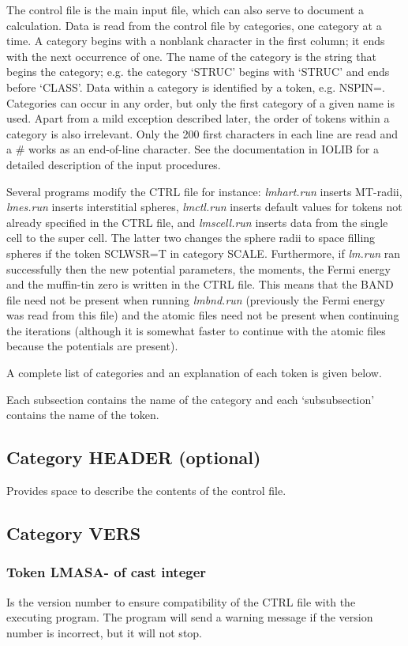 \documentclass[aps,twocolumn,a4]{revtex4}
\begin{document}
The control file is the main input file, which can also serve to
document a calculation.  Data is read from the control file by
categories, one category at a time.  A category begins with a nonblank
character in the first column; it ends with the next occurrence of one.
The name of the category is the string that begins the category; e.g.
the category `STRUC' begins with `STRUC' and ends before `CLASS'.
Data within a category is identified by a token, e.g.  NSPIN=.
Categories can occur in any order, but only the first category of a
given name is used.  Apart from a mild exception described later, the
order of tokens within a category is also irrelevant. Only the 200 first
characters in each line are read and a \# works as an end-of-line
character. See the documentation in IOLIB for a detailed description
of the input procedures.

Several programs modify the CTRL file for instance:
{\em lmhart.run} inserts
MT-radii, {\em lmes.run} inserts interstitial spheres,
{\em lmctl.run} inserts default values for tokens not already
specified in the CTRL file, and {\em lmscell.run} inserts data
from the single cell to the super cell.
The latter two changes the sphere radii
to space filling spheres if the token SCLWSR=T in category SCALE.
Furthermore, if {\em lm.run} ran successfully then the new potential
parameters, the moments, the Fermi energy and the muffin-tin zero is
written in the CTRL file. This means that the BAND file need not be
present when running {\em lmbnd.run} (previously the Fermi energy was
read from this file) and the atomic files need not be present when
continuing the iterations (although it is somewhat faster to continue
with the atomic files because the potentials are present).

A complete list of categories and an explanation of each token is
given below.

Each subsection contains the name of the category and each
`subsubsection' contains the name of the token.

\subsection{Category HEADER (optional)}
Provides space to describe the contents of the
control file.

\subsection{Category VERS}

\subsubsection{Token LMASA- of cast integer}
Is the version number to ensure compatibility of the CTRL
file with the executing program. The program will send a warning
message if the version number is incorrect, but it will not stop.
\end{document}
